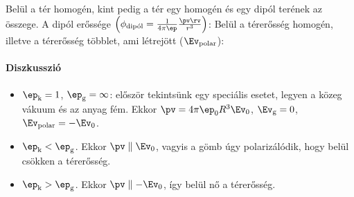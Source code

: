    Belül a tér homogén, kint pedig a tér egy homogén és egy dipól terének az összege.
   A dipól erőssége $\left(\phi_\text{dipól}=\frac{1}{4\pi\ep}\frac{\pv\rv}{r^3}\right)$:
   Belül a térerősség homogén, illetve a térerősség többlet, ami létrejött ($\Ev_\text{polar}$):
   
   \paragraph{Diszkusszió} 
   \begin{itemize}
    \item $\ep_\text{k}=1$, $\ep_\text{g}=\infty$: először tekintsünk egy speciális esetet, legyen a közeg vákuum és az anyag fém.
   Ekkor $\pv=4\pi\ep_0R^3\Ev_0$, $\Ev_\text{g}=0$, $\Ev_\text{polar}=-\Ev_0$. 
    \item $\ep_\text{k}<\ep_\text{g}$.
   Ekkor $\pv \parallel \Ev_0$, vagyis a gömb úgy polarizálódik, hogy belül csökken a térerősség.
    \item $\ep_\text{k}>\ep_\text{g}$.
   Ekkor $\pv \parallel -\Ev_0$, így belül nő a térerősség.
   \end{itemize}
   

